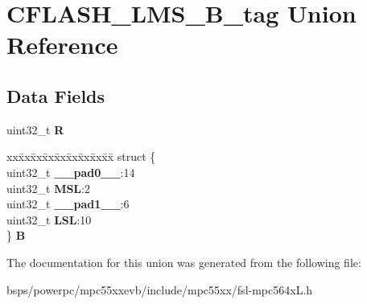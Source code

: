 \hypertarget{unionCFLASH__LMS__32B__tag}{}\section{C\+F\+L\+A\+S\+H\+\_\+\+L\+M\+S\+\_\+B\+\_\+tag Union Reference}
\label{unionCFLASH__LMS__32B__tag}
\subsection*{Data Fields}
\begin{DoxyCompactItemize}
\item 
\mbox{\label{unionCFLASH__LMS__32B__tag_a03886ce4a526707f48805f31d3c9f061}} 
uint32\+\_\+t {\bfseries R}
\item 
\mbox{\label{unionCFLASH__LMS__32B__tag_a8f7de8516da76f1402368da804c6d07b}} 
\begin{tabbing}
xx\=xx\=xx\=xx\=xx\=xx\=xx\=xx\=xx\=\kill
struct \{\\
\>uint32\_t {\bfseries \_\_pad0\_\_}:14\\
\>uint32\_t {\bfseries MSL}:2\\
\>uint32\_t {\bfseries \_\_pad1\_\_}:6\\
\>uint32\_t {\bfseries LSL}:10\\
\} {\bfseries B}\\

\end{tabbing}\end{DoxyCompactItemize}


The documentation for this union was generated from the following file\+:\begin{DoxyCompactItemize}
\item 
bsps/powerpc/mpc55xxevb/include/mpc55xx/fsl-\/mpc564x\+L.\+h\end{DoxyCompactItemize}
